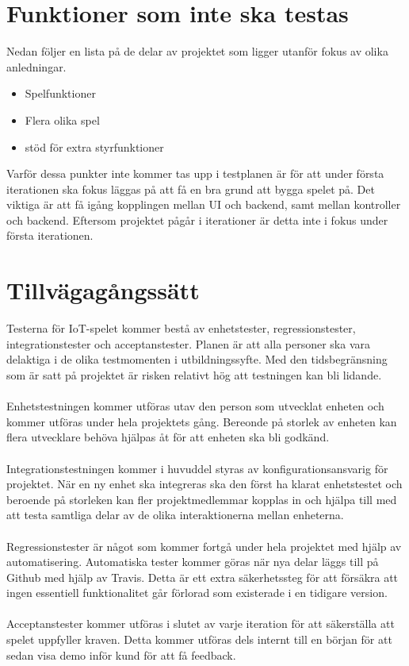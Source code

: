 \documentclass[10pt]{article}
\begin{document}
	
	
\section{Funktioner som inte ska testas}
	Nedan följer en lista på de delar av projektet som ligger utanför fokus av olika anledningar.
	\begin{itemize}
	\item Spelfunktioner
	\item Flera olika spel
	\item stöd för extra styrfunktioner
	\end{itemize}
	Varför dessa punkter inte kommer tas upp i testplanen är för att under första iterationen ska fokus läggas på att få en bra grund att bygga spelet på. Det viktiga är att få igång kopplingen mellan UI och backend, samt mellan kontroller och backend. Eftersom projektet pågår i iterationer är detta inte i fokus under första iterationen.




\section{Tillvägagångssätt}
	Testerna för IoT-spelet kommer bestå av enhetstester, regressionstester, integrationstester och acceptanstester. Planen är att alla personer ska vara delaktiga i de olika 		testmomenten i utbildningssyfte. Med den tidsbegränsning som är satt på projektet är risken relativt hög att testningen kan bli lidande. \\
	\\
	Enhetstestningen kommer utföras utav den person som utvecklat enheten och kommer utföras under hela projektets gång. Bereonde på storlek av enheten kan flera utvecklare behöva hjälpas åt för att enheten ska bli godkänd.\\
	\\
	Integrationstestningen kommer i huvuddel styras av konfigurationsansvarig för projektet. När en ny enhet ska integreras ska den först ha klarat enhetstestet och beroende på storleken kan fler projektmedlemmar kopplas in och hjälpa till med att testa samtliga delar av de olika interaktionerna mellan enheterna. \\
	\\
	Regressionstester är något som kommer fortgå under hela projektet med hjälp av automatisering. Automatiska tester kommer göras när nya delar läggs till på Github med hjälp av {\color{red}Travis}. Detta är ett extra säkerhetssteg för att försäkra att ingen essentiell funktionalitet går förlorad som existerade i en tidigare version.\\
	\\
	Acceptanstester kommer utföras i slutet av varje iteration för att säkerställa att spelet uppfyller kraven. Detta kommer utföras dels internt till en början för att sedan visa demo inför kund för att få feedback. 
	
\end{document}
